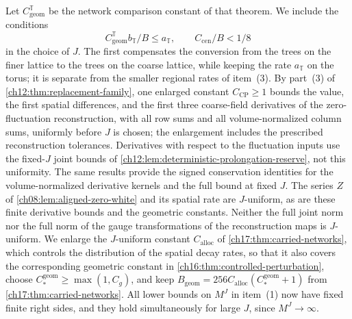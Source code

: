 Let $C^{\mathbb T}_{\mathrm{geom}}$ be the network comparison constant of that theorem. We include the conditions
\begin{equation}\label{ch20:eq:torus-spatial-gate}
 C^{\mathbb T}_{\mathrm{geom}}b_{\mathbb T}/B\le a_{\mathbb T},\qquad C_{\mathrm{cen}}/B<1/8
\end{equation}
in the choice of $J$. The first compensates the conversion from the trees on the finer lattice to the trees on the coarse lattice, while keeping the rate $a_{\mathbb T}$ on the torus; it is separate from the smaller regional rates of item~(3). By part~(3) of \cref{ch12:thm:replacement-family}, one enlarged constant $C_{\mathrm{CP}}\ge1$ bounds the value, the first spatial differences, and the first three coarse-field derivatives of the zero-fluctuation reconstruction, with all row sums and all volume-normalized column sums, uniformly before $J$ is chosen; the enlargement includes the prescribed reconstruction tolerances. Derivatives with respect to the fluctuation inputs use the fixed-$J$ joint bounds of \cref{ch12:lem:deterministic-prolongation-reserve}, not this uniformity. The same results provide the signed conservation identities for the volume-normalized derivative kernels and the full bound at fixed $J$. The series $Z$ of \cref{ch08:lem:aligned-zero-white} and its spatial rate are $J$-uniform, as are these finite derivative bounds and the geometric constants. Neither the full joint norm nor the full norm of the gauge transformations of the reconstruction maps is $J$-uniform. We enlarge the $J$-uniform constant $C_{\mathrm{alloc}}$ of \cref{ch17:thm:carried-networks}, which controls the distribution of the spatial decay rates, so that it also covers the corresponding geometric constant in \cref{ch16:thm:controlled-perturbation}, choose $C_*^{\mathrm{geom}}\ge\max(1,C_g)$, and keep $B_{\mathrm{geom}}=256C_{\mathrm{alloc}}(C_*^{\mathrm{geom}}+1)$ from \cref{ch17:thm:carried-networks}. All lower bounds on $M^J$ in item~(1) now have fixed finite right sides, and they hold simultaneously for large $J$, since $M^J\to\infty$.

